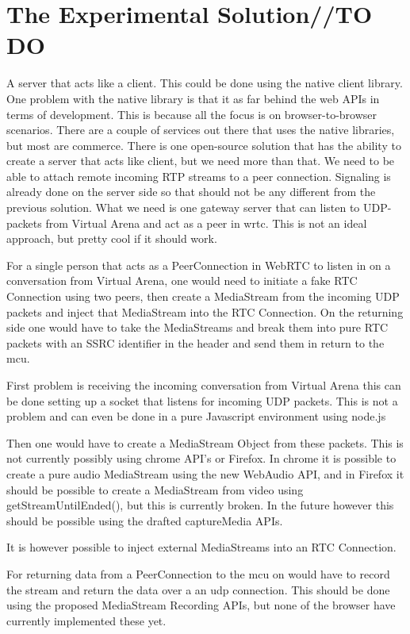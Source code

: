 
\section{The Experimental Solution//TO DO}

A server that acts like a client. This could be done using the native client library. One problem with the native library is that it as far behind the web APIs in terms of development. This is because all the focus is on browser-to-browser scenarios. There are a couple of services out there that uses the native libraries, but most are commerce. There is one open-source solution that has the ability to create a server that acts like client, but we need more than that. We need to be able to attach remote incoming RTP streams to a peer connection. Signaling is already done on the server side so that should not be any different from the previous solution. What we need is one gateway server that can listen to UDP-packets from Virtual Arena and act as a peer in \gls{wrtc}. This is not an ideal approach, but pretty cool if it should work.

For a single person that acts as a PeerConnection in WebRTC to listen in on a conversation from Virtual Arena, one would need to initiate a fake RTC Connection using two peers, then create a MediaStream from the incoming UDP packets and inject that MediaStream into the RTC Connection. On the returning side one would have to take the MediaStreams and break them into pure RTC packets with an SSRC identifier in the header and send them in return to the \gls{mcu}.

First problem is receiving the incoming conversation from Virtual Arena this can be done setting up a socket that listens for incoming UDP packets. This is not a problem and can even be done in a pure Javascript environment using node.js

Then one would have to create a MediaStream Object from these packets. This is not currently possibly using chrome API's or Firefox. In chrome it is possible to create a pure audio MediaStream using the new WebAudio API, and in Firefox it should be possible to create a MediaStream from video using getStreamUntilEnded(), but this is currently broken. In the future however this should be possible using the drafted captureMedia APIs.

It is however possible to inject external MediaStreams into an RTC Connection.

For returning data from a PeerConnection to the \gls{mcu} on would have to record the stream and return the data over a an \gls{udp} connection. This should be done using the proposed MediaStream Recording APIs, but none of the browser have currently implemented these yet.